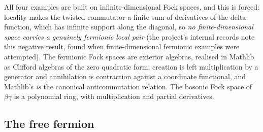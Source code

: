 All four examples are built on infinite-dimensional Fock spaces, and this is forced: locality makes
the twisted commutator a finite sum of derivatives of the delta function, which has infinite support
along the diagonal, so \emph{no finite-dimensional space carries a genuinely fermionic local pair}
(the project's internal records note this negative result, found when finite-dimensional
fermionic examples were attempted). The fermionic Fock spaces are exterior algebras, realised in Mathlib as Clifford algebras of
the zero quadratic form; creation is left multiplication by a generator and annihilation is
contraction against a coordinate functional, and Mathlib's 
\emph{is} the canonical anticommutation relation. The bosonic Fock space of $\beta\gamma$ is a
polynomial ring, with multiplication and partial derivatives.

\subsection{The free fermion}\label{l17:sec:ff}

